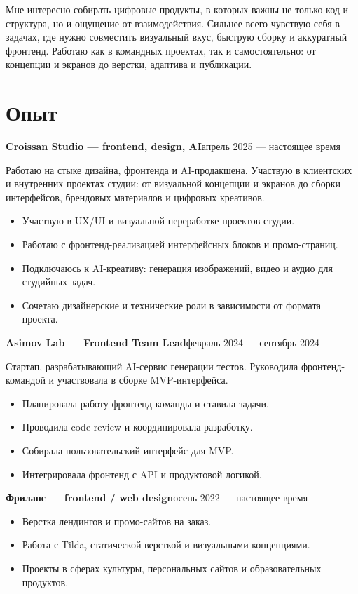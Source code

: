 \documentclass[11pt,a4paper]{article}
\newcommand{\roleline}[2]{
  \textbf{#1}\hfill\textcolor{dategray}{\normalfont #2}
}
\begin{document}
Мне интересно собирать цифровые продукты, в которых важны не только код и структура, но и ощущение от взаимодействия. Сильнее всего чувствую себя в задачах, где нужно совместить визуальный вкус, быструю сборку и аккуратный фронтенд. Работаю как в командных проектах, так и самостоятельно: от концепции и экранов до верстки, адаптива и публикации.

\section*{Опыт}

\roleline{Croissan Studio — frontend, design, AI}{апрель 2025 --- настоящее время}

Работаю на стыке дизайна, фронтенда и AI-продакшена. Участвую в клиентских и внутренних проектах студии: от визуальной концепции и экранов до сборки интерфейсов, брендовых материалов и цифровых креативов.

\begin{itemize}
  \item Участвую в UX/UI и визуальной переработке проектов студии.
  \item Работаю с фронтенд-реализацией интерфейсных блоков и промо-страниц.
  \item Подключаюсь к AI-креативу: генерация изображений, видео и аудио для студийных задач.
  \item Сочетаю дизайнерские и технические роли в зависимости от формата проекта.
\end{itemize}

\roleline{Asimov Lab — Frontend Team Lead}{февраль 2024 --- сентябрь 2024}

Стартап, разрабатывающий AI-сервис генерации тестов. Руководила фронтенд-командой и участвовала в сборке MVP-интерфейса.

\begin{itemize}
  \item Планировала работу фронтенд-команды и ставила задачи.
  \item Проводила code review и координировала разработку.
  \item Собирала пользовательский интерфейс для MVP.
  \item Интегрировала фронтенд с API и продуктовой логикой.
\end{itemize}

\roleline{Фриланс — frontend / web design}{осень 2022 --- настоящее время}

\begin{itemize}
  \item Верстка лендингов и промо-сайтов на заказ.
  \item Работа с Tilda, статической версткой и визуальными концепциями.
  \item Проекты в сферах культуры, персональных сайтов и образовательных продуктов.
\end{itemize}
\end{document}
